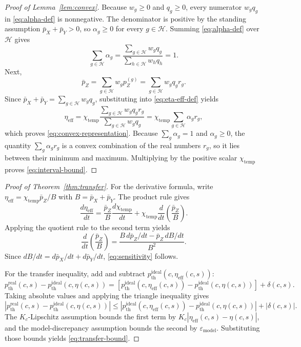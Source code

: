 \documentclass{article} %
\begin{document}
\begin{proof}[Proof of Lemma~\ref{lem:convex}]
Because $w_g \ge 0$ and $q_g \ge 0$, every numerator $w_g q_g$ in \eqref{eq:alpha-def} is nonnegative. The denominator is positive by the standing assumption $\bar p_X + \bar p_Y > 0$, so $\alpha_g \ge 0$ for every $g \in \mathcal{H}$. Summing \eqref{eq:alpha-def} over $\mathcal{H}$ gives
\[
\sum_{g \in \mathcal{H}} \alpha_g
=
\frac{\sum_{g \in \mathcal{H}} w_g q_g}{\sum_{h \in \mathcal{H}} w_h q_h}
= 1.
\]
Next,
\[
\bar p_Z
=
\sum_{g \in \mathcal{H}} w_g p_Z^{(g)}
=
\sum_{g \in \mathcal{H}} w_g q_g r_g.
\]
Since $\bar p_X + \bar p_Y = \sum_{g \in \mathcal{H}} w_g q_g$, substituting into \eqref{eq:eta-eff-def} yields
\[
\eta_{\mathrm{eff}}
=
\chi_{\mathrm{temp}}
\frac{\sum_{g \in \mathcal{H}} w_g q_g r_g}{\sum_{g \in \mathcal{H}} w_g q_g}
=
\chi_{\mathrm{temp}}
\sum_{g \in \mathcal{H}} \alpha_g r_g,
\]
which proves \eqref{eq:convex-representation}. Because $\sum_g \alpha_g = 1$ and $\alpha_g \ge 0$, the quantity $\sum_g \alpha_g r_g$ is a convex combination of the real numbers $r_g$, so it lies between their minimum and maximum. Multiplying by the positive scalar $\chi_{\mathrm{temp}}$ proves \eqref{eq:interval-bound}. \qedhere
\end{proof}

\begin{proof}[Proof of Theorem~\ref{thm:transfer}]
For the derivative formula, write $\eta_{\mathrm{eff}} = \chi_{\mathrm{temp}}\bar p_Z/B$ with $B=\bar p_X+\bar p_Y$. The product rule gives
\[
\frac{d\eta_{\mathrm{eff}}}{dt}
=
\frac{\bar p_Z}{B}\frac{d\chi_{\mathrm{temp}}}{dt}
+
\chi_{\mathrm{temp}}\frac{d}{dt}\left(\frac{\bar p_Z}{B}\right).
\]
Applying the quotient rule to the second term yields
\[
\frac{d}{dt}\left(\frac{\bar p_Z}{B}\right)
=
\frac{B\,d\bar p_Z/dt - \bar p_Z\,dB/dt}{B^2}.
\]
Since $dB/dt = d\bar p_X/dt + d\bar p_Y/dt$, \eqref{eq:sensitivity} follows.

For the transfer inequality, add and subtract $p_{\mathrm{th}}^{\mathrm{ideal}}(c,\eta_{\mathrm{eff}}(c,s))$:
\[
p_{\mathrm{th}}^{\mathrm{real}}(c,s) - p_{\mathrm{th}}^{\mathrm{ideal}}(c,\eta(c,s))
=
\left[p_{\mathrm{th}}^{\mathrm{ideal}}(c,\eta_{\mathrm{eff}}(c,s)) - p_{\mathrm{th}}^{\mathrm{ideal}}(c,\eta(c,s))\right]
+
\delta(c,s).
\]
Taking absolute values and applying the triangle inequality gives
\[
\left|
p_{\mathrm{th}}^{\mathrm{real}}(c,s) - p_{\mathrm{th}}^{\mathrm{ideal}}(c,\eta(c,s))
\right|
\le
\left|
p_{\mathrm{th}}^{\mathrm{ideal}}(c,\eta_{\mathrm{eff}}(c,s)) - p_{\mathrm{th}}^{\mathrm{ideal}}(c,\eta(c,s))
\right|
+
|\delta(c,s)|.
\]
The $K_c$-Lipschitz assumption bounds the first term by $K_c|\eta_{\mathrm{eff}}(c,s)-\eta(c,s)|$, and the model-discrepancy assumption bounds the second by $\varepsilon_{\mathrm{model}}$. Substituting those bounds yields \eqref{eq:transfer-bound}. \qedhere
\end{proof}
\end{document}
